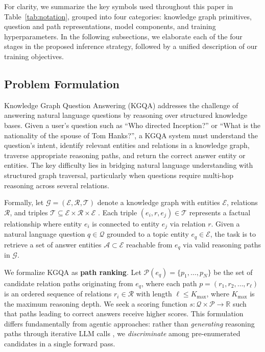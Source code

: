 \documentclass[conference]{IEEEtran}
\begin{document}
For clarity, we summarize the key symbols used throughout this paper in Table~\ref{tab:notation}, grouped into four categories: knowledge graph primitives, question and path representations, model components, and training hyperparameters. In the following subsections, we elaborate each of the four stages in the proposed inference strategy, followed by a unified description of our training objectives.

\subsection{Problem Formulation}

Knowledge Graph Question Answering (KGQA) addresses the challenge of answering natural language questions by reasoning over structured knowledge bases. Given a user's question such as ``Who directed Inception?'' or ``What is the nationality of the spouse of Tom Hanks?'', a KGQA system must understand the question's intent, identify relevant entities and relations in a knowledge graph, traverse appropriate reasoning paths, and return the correct answer entity or entities. The key difficulty lies in bridging natural language understanding with structured graph traversal, particularly when questions require multi-hop reasoning across several relations.

Formally, let $\mathcal{G} = (\mathcal{E}, \mathcal{R}, \mathcal{T})$ denote a knowledge graph with entities $\mathcal{E}$, relations $\mathcal{R}$, and triples $\mathcal{T} \subseteq \mathcal{E} \times \mathcal{R} \times \mathcal{E}$ \cite{bollacker2008freebase}. Each triple $(e_i, r, e_j) \in \mathcal{T}$ represents a factual relationship where entity $e_i$ is connected to entity $e_j$ via relation $r$. Given a natural language question $q \in \mathcal{Q}$ grounded to a topic entity $e_q \in \mathcal{E}$, the task is to retrieve a set of answer entities $\mathcal{A} \subset \mathcal{E}$ reachable from $e_q$ via valid reasoning paths in $\mathcal{G}$.

We formalize KGQA as \textbf{path ranking}. Let $\mathcal{P}(e_q) = \{p_1, \ldots, p_N\}$ be the set of candidate relation paths originating from $e_q$, where each path $p = (r_1, r_2, \ldots, r_\ell)$ is an ordered sequence of relations $r_i \in \mathcal{R}$ with length $\ell \leq K_{\text{max}}$, where $K_{\text{max}}$ is the maximum reasoning depth. We seek a scoring function $s: \mathcal{Q} \times \mathcal{P} \rightarrow \mathbb{R}$ such that paths leading to correct answers receive higher scores. This formulation differs fundamentally from agentic approaches: rather than \emph{generating} reasoning paths through iterative LLM calls \cite{sun2024tog, luo2024rog}, we \emph{discriminate} among pre-enumerated candidates in a single forward pass.
\end{document}
